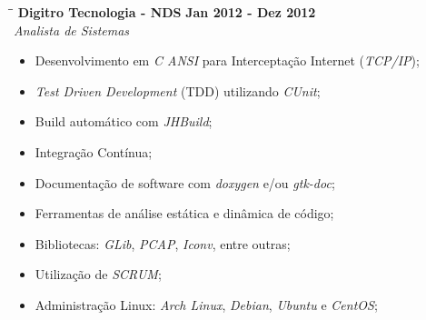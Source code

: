 \documentclass[margin]{res}
\begin{document}
\begin{resume}
   \begin{tabbing}
   \hspace{2.3in}\= \hspace{1.7in}\= \kill %
    \textbf{Digitro Tecnologia - NDS}    \>\>\textbf{Jan 2012 - Dez 2012}\\
    \textit{Analista de Sistemas}                         
   \end{tabbing}\vspace{-20pt}      %
    \vspace{5mm}
    \begin{itemize}
     \item Desenvolvimento em \textit{C ANSI} para Interceptação Internet (\textit{TCP/IP});
     \item \textit{Test Driven Development} (TDD) utilizando \textit{CUnit};
     \item Build automático com \textit{JHBuild};
     \item Integração Contínua;
     \item Documentação de software com \textit{doxygen} e/ou \textit{gtk-doc};
     \item Ferramentas de análise estática e dinâmica de código;
     \item Bibliotecas: \textit{GLib}, \textit{PCAP}, \textit{Iconv}, entre outras; 
     \item Utilização de \textit{SCRUM}; 
     \item Administração Linux: \textit{Arch Linux}, \textit{Debian}, \textit{Ubuntu} e \textit{CentOS};
    \end{itemize}
 

\end{resume}
\end{document}

